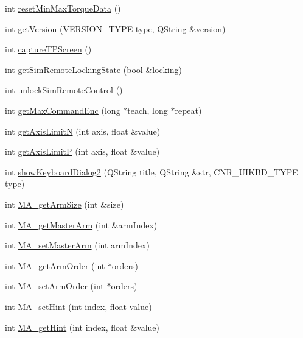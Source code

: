 \begin{DoxyCompactItemize}
\item 
int \hyperlink{classCUIApp_a4c947f133769866ed8f83ca0fb26b8bf}{reset\-Min\-Max\-Torque\-Data} ()
\item 
int \hyperlink{classCUIApp_a6c61ac6cf4cf719bad5459bbefc37659}{get\-Version} (V\-E\-R\-S\-I\-O\-N\-\_\-\-T\-Y\-P\-E type, Q\-String \&version)
\item 
int \hyperlink{classCUIApp_a3fcfb168dae008b23e8f13e59255a6ed}{capture\-T\-P\-Screen} ()
\item 
int \hyperlink{classCUIApp_af7ae494817cae7f75cc8c6ebe6734b06}{get\-Sim\-Remote\-Locking\-State} (bool \&locking)
\item 
int \hyperlink{classCUIApp_ad71f35d03ef250c61d8ce09ca8d7711d}{unlock\-Sim\-Remote\-Control} ()
\item 
int \hyperlink{classCUIApp_a2d46b9b2b22bb7246d3792cf4bad2f44}{get\-Max\-Command\-Enc} (long $\ast$teach, long $\ast$repeat)
\item 
int \hyperlink{classCUIApp_a8c2e9da78bd542683251de15ff090aab}{get\-Axis\-Limit\-N} (int axis, float \&value)
\item 
int \hyperlink{classCUIApp_adbd068136322b3710771cbe2a1e15f73}{get\-Axis\-Limit\-P} (int axis, float \&value)
\item 
int \hyperlink{classCUIApp_a2eaf81625d2a5e6c313b226c9b6efe2a}{show\-Keyboard\-Dialog2} (Q\-String title, Q\-String \&str, C\-N\-R\-\_\-\-U\-I\-K\-B\-D\-\_\-\-T\-Y\-P\-E type)
\item 
int \hyperlink{classCUIApp_a03be3a483fe4e7bc66b0901a371e5844}{M\-A\-\_\-get\-Arm\-Size} (int \&size)
\item 
int \hyperlink{classCUIApp_a0be596e95462c8988c11610db06d2df7}{M\-A\-\_\-get\-Master\-Arm} (int \&arm\-Index)
\item 
int \hyperlink{classCUIApp_a6b8a73f6e2c11b4b6a9b0694430d28c4}{M\-A\-\_\-set\-Master\-Arm} (int arm\-Index)
\item 
int \hyperlink{classCUIApp_a6e584251c583f2faa46c8edb5a2c5a6f}{M\-A\-\_\-get\-Arm\-Order} (int $\ast$orders)
\item 
int \hyperlink{classCUIApp_a0bc1523ac0f460af9466c3f946c43cc4}{M\-A\-\_\-set\-Arm\-Order} (int $\ast$orders)
\item 
int \hyperlink{classCUIApp_a088315a031f6ac9968c2c59c3cd9bfb7}{M\-A\-\_\-set\-Hint} (int index, float value)
\item 
int \hyperlink{classCUIApp_a76041e3a86c423e0572d94c72f74f1fc}{M\-A\-\_\-get\-Hint} (int index, float \&value)
\end{DoxyCompactItemize}
